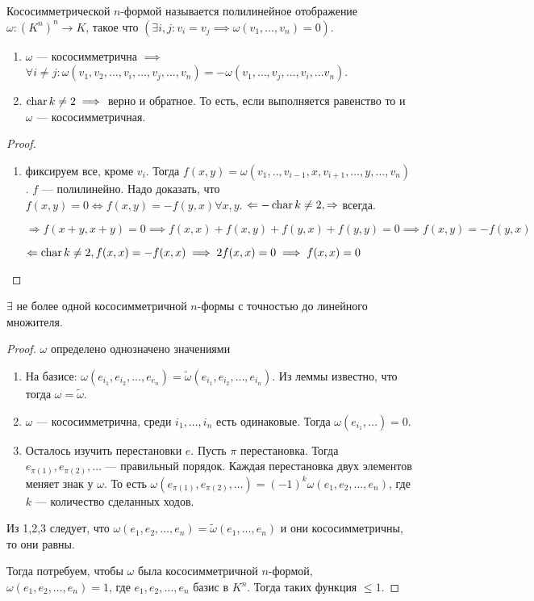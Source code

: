 \begin{definition}
    Кососимметрической $n$-формой называется полилинейное отображение  $\omega\!: (K^n)^n \to K$, такое что  $(\exists i, j\!: v_i = v_j \implies \omega(v_1, \ldots, v_n) = 0)$.
\end{definition}
\begin{statement}
    \begin{enumerate}
        \item $\omega$ --- кососимметрична  $\implies$  $\forall i \neq j\!: \omega(v_1, v_2, \ldots, v_i, \ldots, v_j, \ldots, v_n) = - \omega(v_1,\ldots, v_j, \ldots, v_i, \ldots v_n)$.
        \item $\operatorname{char} k \neq 2 \implies $ верно и обратное. То есть, если выполняется равенство то и  $\omega$ --- кососимметричная. 
    \end{enumerate}
\end{statement}
\begin{proof}
    \begin{enumerate}
        \item фиксируем все, кроме $v_i$. Тогда  $f(x, y) = \omega(v_1, .., v_{i-1}, x, v_{i+1}, \ldots, y, \ldots, v_n)$. $f$ --- полилинейно. Надо доказать, что $f(x, y) = 0 \iff f(x, y) = -f(y, x) \forall x, y$. $\Leftarrow - \operatorname{char} k \not = 2, \Rightarrow$ всегда.

        $\Rightarrow f(x + y, x + y) = 0 \implies f(x, x) + f(x, y) + f(y, x) + f(y, y) = 0 \implies f(x, y) = - f(y, x)$

        $\Leftarrow \operatorname{char} k \not = 2, f(x, x) = -f(x, x) \implies 2f(x, x) = 0 \implies f(x, x) = 0$
    \end{enumerate}
\end{proof}
\begin{statement}
    $\exists$ не более одной кососимметричной  $n$-формы с точностью до линейного множителя.
\end{statement}
\begin{proof}
    $\omega$ определено однозначено значениями
     \begin{enumerate}
         \item На базисе: $\omega(e_{i_1}, e_{i_2}, \ldots, e_{e_n}) = \widetilde{\omega}(e_{i_1}, e_{i_2}, \ldots, e_{i_n})$. Из леммы известно, что тогда $\omega = \widetilde{\omega}$. 
         \item $\omega$ --- кососимметрична, среди  $i_1, \ldots, i_n$ есть одинаковые. Тогда $\omega(e_{i_1},\ldots) = 0$.
         \item Осталось изучить перестановки $e$. Пусть $\pi$ перестановка. Тогда  $e_{\pi(1)}, e_{\pi(2)}, \ldots$ --- правильный порядок. Каждая перестановка двух элементов меняет знак у $\omega$. То есть  $\omega(e_{\pi(1)}, e_{\pi(2)}, \ldots) = (-1)^k \omega(e_1, e_2, \ldots, e_n)$, где $k$ --- количество сделанных ходов.
    \end{enumerate}
    Из 1,2,3 следует, что  $\omega(e_1, e_2, \ldots, e_n) = \widetilde{\omega}(e_1, \ldots, e_n)$ и они кососимметричны, то они равны. 

    Тогда потребуем, чтобы $\omega$ была кососимметричной  $n$-формой,  $\omega(e_1, e_2,\ldots, e_n) = 1$, где $e_1, e_2, \ldots, e_n$ базис в $K^n$. Тогда таких функция  $\le 1$.
\end{proof}
